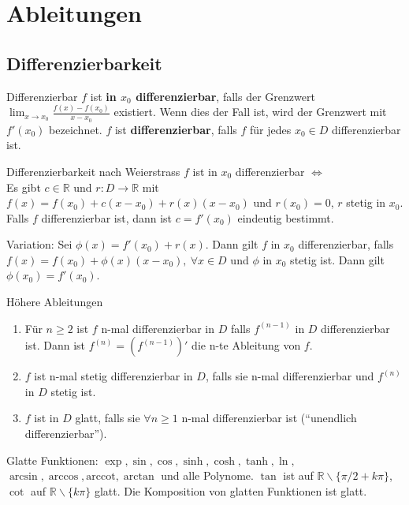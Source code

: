 \documentclass[a4paper,10pt]{article}
\def\R{\mathbb{R}}
\begin{document}
\section{Ableitungen}
\subsection{Differenzierbarkeit}
\begin{mainbox}{Differenzierbar}
 $f$ ist \textbf{in $x_0$ differenzierbar}, falls der Grenzwert $\lim_{x\to x_0} \frac{f(x) - f(x_0)}{x - x_0}$ existiert. Wenn dies der Fall ist, wird der Grenzwert mit $f'(x_0)$ bezeichnet. $f$ ist \textbf{differenzierbar}, falls $f$ für jedes $x_0 \in D$ differenzierbar ist.
\end{mainbox}
\begin{subbox}{Differenzierbarkeit nach Weierstrass}
 $f$ ist in $x_0$ differenzierbar $\iff$ \\
 Es gibt $c \in \R$ und $r: D \to \R$ mit $f(x) = f(x_0) + c(x - x_0) + r(x) (x - x_0)$ und $r(x_0) = 0$, $r$ stetig in $x_0$. \\
 Falls $f$ differenzierbar ist, dann ist $c = f'(x_0)$ eindeutig bestimmt.
\end{subbox}
Variation: Sei $\phi(x) = f'(x_0) + r(x)$. Dann gilt $f$ in $x_0$ differenzierbar, falls $f(x) = f(x_0) + \phi(x) (x-x_0), \ \forall x \in D$ und $\phi$ in $x_0$ stetig ist.
Dann gilt $\phi(x_0) = f'(x_0)$.

\begin{mainbox}{Höhere Ableitungen}
 \begin{enumerate}
  \item Für $n \ge 2$ ist $f$ n-mal differenzierbar in $D$ falls $f^{(n-1)}$ in $D$ differenzierbar ist. Dann ist $f^{(n)} = (f^{(n-1)})'$ die n-te Ableitung von $f$.
  \item $f$ ist n-mal stetig differenzierbar in $D$, falls sie n-mal differenzierbar und $f^{(n)}$ in $D$ stetig ist.
  \item $f$ ist in $D$ glatt, falls sie $\forall n \ge 1$ n-mal differenzierbar ist (``unendlich differenzierbar'').
 \end{enumerate}
\end{mainbox}
Glatte Funktionen: $\exp, \sin, \cos, \sinh, \cosh, \tanh, \ln,$\\ $ \arcsin, \arccos, \text{arccot}, \arctan$ und alle Polynome. $\tan$ ist auf $\R \backslash \{\pi/2 + k\pi\}$, $\cot$ auf $\R \backslash \{k\pi\}$ glatt. Die Komposition von glatten Funktionen ist glatt.
\end{document}
